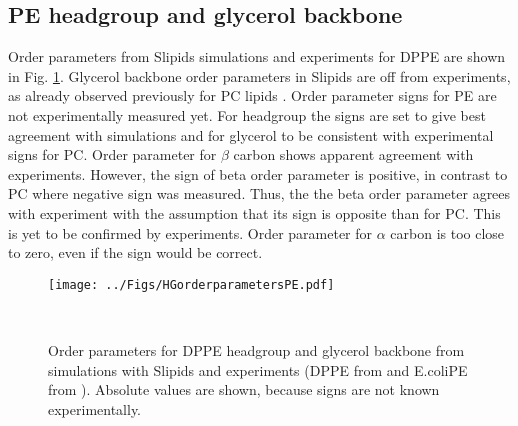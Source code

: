 \documentclass[aps,prl,superscriptaddress,twocolumn]{revtex4}
\begin{document}
\subsection{PE headgroup and glycerol backbone}
Order parameters from Slipids simulations 
and experiments for DPPE are shown in Fig. \ref{HGorderParametersPE}.
Glycerol backbone order parameters in Slipids are off from experiments,
as already observed previously for PC lipids \cite{botan15}.
Order parameter signs for PE are not experimentally measured yet.
For headgroup the signs are set to give best agreement with simulations
and for glycerol to be consistent with experimental signs for PC.
Order parameter for $\beta$ carbon shows apparent agreement
with experiments. However, the sign of beta order parameter is positive,
in contrast to PC where negative sign was measured. Thus, the the beta order
parameter agrees with experiment with the assumption that its sign is opposite
than for PC. This is yet to be confirmed by experiments.
Order parameter for $\alpha$ carbon is too close to zero, even if the sign
would be correct.

\begin{figure}[]
  \centering
  \texttt{[image: ../Figs/HGorderparametersPE.pdf]}
  \caption{\label{HGorderParametersPE}
    Order parameters for DPPE headgroup and glycerol
    backbone from simulations with Slipids \cite{??} and experiments
    (DPPE from \cite{seelig76} and E.coliPE from \cite{gally81}).
    Absolute values are shown, because signs are not known experimentally.
  }
   \\
\end{figure}

\end{document}
